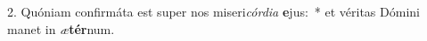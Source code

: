 2. Quóniam confirmáta est super nos miseri\textit{cór}\textit{di}\textit{a} \textbf{e}jus:~*  et véritas Dómini manet in \textit{æ}\textbf{tér}num.\

